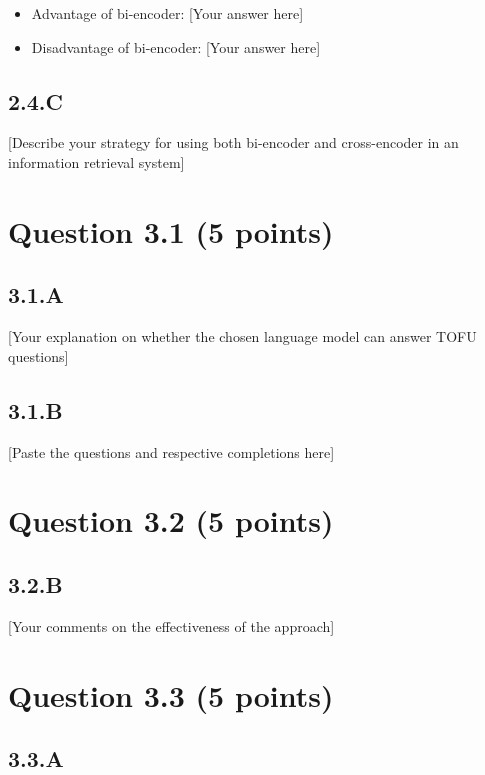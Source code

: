 \documentclass{article}
\begin{document}
\begin{itemize}
    \item Advantage of bi-encoder: [Your answer here]
    \item Disadvantage of bi-encoder: [Your answer here]
\end{itemize}

\subsection*{2.4.C}

[Describe your strategy for using both bi-encoder and cross-encoder in an information retrieval system]

\section*{Question 3.1 (5 points)}

\subsection*{3.1.A}

[Your explanation on whether the chosen language model can answer TOFU questions]

\subsection*{3.1.B}

[Paste the questions and respective completions here]

\section*{Question 3.2 (5 points)}

\subsection*{3.2.B}

[Your comments on the effectiveness of the approach]

\section*{Question 3.3 (5 points)}

\subsection*{3.3.A}
\end{document}
